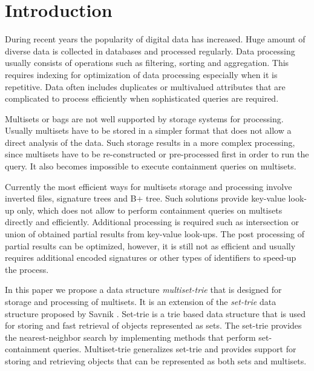 \section{Introduction} \label{c:introduction}
%
During recent years the popularity of digital data has increased. Huge amount of diverse data is collected in databases and 
processed regularly. Data processing usually consists of operations such as filtering, sorting and aggregation. This requires 
indexing for optimization of data processing especially when it is repetitive. Data often includes duplicates or multivalued 
attributes that are complicated to process efficiently when sophisticated queries are required.

Multisets or bags are not well supported by storage systems for processing. Usually multisets have to be stored in a 
simpler format that does not allow a direct analysis of the data. Such storage results in a more complex processing, 
since multisets have to be re-constructed or pre-processed first in order to run the query. It also becomes impossible
to execute containment queries on multisets.

Currently the most efficient ways for multisets storage and processing involve inverted files, signature trees and B+ tree.
Such solutions provide key-value look-up only, which does not allow to perform containment queries on multisets directly and efficiently.
Additional processing is required such as intersection or union of obtained partial results from key-value look-ups. The post 
processing of partial results can be optimized, however, it is still not as efficient and usually requires additional encoded 
signatures or other types of identifiers to speed-up the process.


%
In this paper we propose a data structure \emph{multiset-trie} that is designed for storage and processing of multisets.
It is an extension of the \emph{set-trie} data structure proposed by Savnik \cite{savnik2013index}. 
Set-trie is a trie based data structure that is used for storing and fast retrieval of 
objects represented as sets. The set-trie provides the nearest-neighbor search by 
implementing methods that perform set-containment queries. Multiset-trie generalizes 
set-trie and provides support for storing and retrieving objects that can be represented 
as both sets and multisets. 

